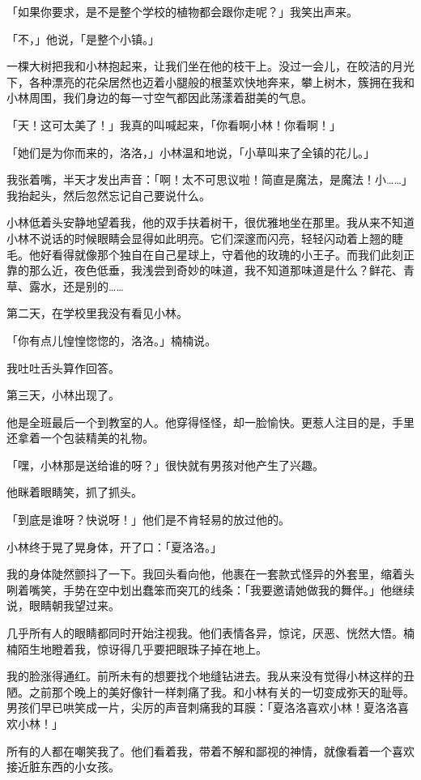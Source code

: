 \documentclass[UTF8]{ctexart}
\begin{document}
「如果你要求，是不是整个学校的植物都会跟你走呢？」我笑出声来。

「不，」他说，「是整个小镇。」

一棵大树把我和小林抱起来，让我们坐在他的枝干上。没过一会儿，在皎洁的月光下，各种漂亮的花朵居然也迈着小腿般的根茎欢快地奔来，攀上树木，簇拥在我和小林周围，我们身边的每一寸空气都因此荡漾着甜美的气息。

「天！这可太美了！」我真的叫喊起来，「你看啊小林！你看啊！」

「她们是为你而来的，洛洛，」小林温和地说，「小草叫来了全镇的花儿。」

我张着嘴，半天才发出声音：「啊！太不可思议啦！简直是魔法，是魔法！小……」我抬起头，然后忽然忘记自己要说什么。

小林低着头安静地望着我，他的双手扶着树干，很优雅地坐在那里。我从来不知道小林不说话的时候眼睛会显得如此明亮。它们深邃而闪亮，轻轻闪动着上翘的睫毛。他好看得就像那个独自在自己星球上，守着他的玫瑰的小王子。而我们此刻正靠的那么近，夜色低垂，我浅尝到奇妙的味道，我不知道那味道是什么？鲜花、青草、露水，还是别的……

第二天，在学校里我没有看见小林。

「你有点儿惶惶惚惚的，洛洛。」楠楠说。

我吐吐舌头算作回答。

第三天，小林出现了。

他是全班最后一个到教室的人。他穿得怪怪，却一脸愉快。更惹人注目的是，手里还拿着一个包装精美的礼物。

「嘿，小林那是送给谁的呀？」很快就有男孩对他产生了兴趣。

他眯着眼睛笑，抓了抓头。

「到底是谁呀？快说呀！」他们是不肯轻易的放过他的。

小林终于晃了晃身体，开了口：「夏洛洛。」

我的身体陡然颤抖了一下。我回头看向他，他裹在一套款式怪异的外套里，缩着头咧着嘴笑，手势在空中划出蠢笨而突兀的线条：「我要邀请她做我的舞伴。」他继续说，眼睛朝我望过来。

几乎所有人的眼睛都同时开始注视我。他们表情各异，惊诧，厌恶、恍然大悟。楠楠陌生地瞪着我，惊讶得几乎要把眼珠子掉在地上。

我的脸涨得通红。前所未有的想要找个地缝钻进去。我从来没有觉得小林这样的丑陋。之前那个晚上的美好像针一样刺痛了我。和小林有关的一切变成弥天的耻辱。男孩们早已哄笑成一片，尖厉的声音刺痛我的耳膜：「夏洛洛喜欢小林！夏洛洛喜欢小林！」

所有的人都在嘲笑我了。他们看着我，带着不解和鄙视的神情，就像看着一个喜欢接近脏东西的小女孩。
\end{document}
